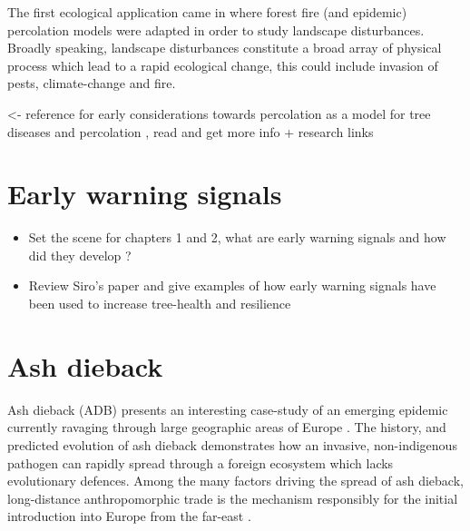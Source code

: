 The first ecological application came in \cite{pub.1031591030} where forest fire (and epidemic) percolation models were adapted in order to study landscape disturbances. Broadly speaking, landscape disturbances constitute a broad array of physical process which lead to a rapid ecological change, this could include invasion of pests, climate-change and fire.

\textemdash\cite{GRASSBERGER1983157} <- reference for early considerations towards percolation as a model for tree diseases and percolation
\textemdash\cite{SANDER2002293}, read and get more info + research links

\section{Early warning signals}

\label{section:ews}
\begin{itemize}
    \item Set the scene for chapters 1 and 2, what are early warning signals and how did they develop ?
    \item Review Siro's paper and give examples of how early warning signals have been used to increase tree-health and resilience 
\end{itemize}


\section{Ash dieback}




\label{ch2:ash-dieback}
Ash dieback (ADB) presents an interesting case-study of an emerging epidemic currently ravaging through large geographic areas of Europe \cite{enderle2019overview}.
The history, and predicted evolution of ash dieback demonstrates how an invasive, non-indigenous pathogen can rapidly spread through a foreign ecosystem which lacks evolutionary defences.
Among the many factors driving the spread of ash dieback, long-distance anthropomorphic trade is the mechanism responsibly for the initial introduction into Europe from the far-east \cite{zhao2013hymenoscyphus, queloz2011cryptic}.

